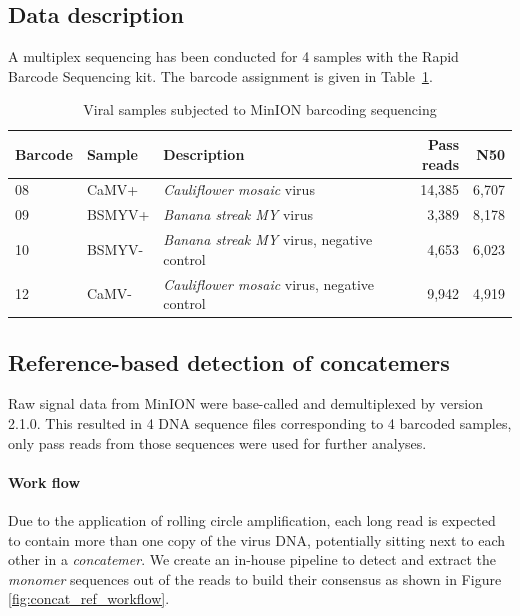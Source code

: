 \subsection{Data description}
A multiplex sequencing has been conducted for 4 samples with the Rapid Barcode Sequencing kit. The barcode assignment is given in Table~\ref{tab:viral_samples}.
\begin{table}[!ht]
\centering
\caption{Viral samples subjected to MinION barcoding sequencing}
\label{tab:viral_samples}
\begin{tabular}{lllrr}
\hline
\toprule
\textbf{Barcode} & \textbf{Sample} & \textbf{Description} & \textbf{Pass reads}  & \textbf{N50}    \\
\hline
\rowcolor{Gray}
08                  & CaMV+              & \emph{Cauliflower mosaic} virus  &   14,385   &      6,707 \\
09                  & BSMYV+             & \emph{Banana streak MY} virus    &   3,389   &   8,178   \\       
\rowcolor{Gray}
10                  & BSMYV-             & \emph{Banana streak MY} virus, negative control     &   4,653   &  6,023   \\
12                  & CaMV-              & \emph{Cauliflower mosaic} virus, negative control     &   9,942   &  4,919   \\\hline
\end{tabular}
\end{table}

\subsection{Reference-based detection of concatemers}
Raw signal data from MinION were base-called and demultiplexed by \albacore{} version 2.1.0. This resulted in 4 DNA sequence files corresponding to 4 barcoded samples, only pass reads from those sequences were used for further analyses.

\paragraph{Work flow} Due to the application of rolling circle amplification, each long read is expected to contain more than one copy of the virus DNA, potentially sitting next to each other in a \emph{concatemer}. We create an in-house pipeline to detect and extract the \emph{monomer} sequences out of the reads to build their consensus as shown in Figure \ref{fig:concat_ref_workflow}.


